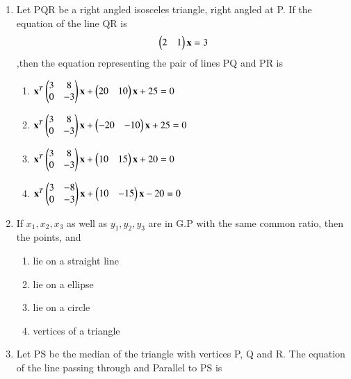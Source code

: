 \begin{enumerate}
\begin{enumerate}
     \item {}
     \item {}
     \item {}
     \end{enumerate}
    \item Let PQR be a right angled isosceles triangle, right angled at  P. If the equation of the line QR is \begin{align}\begin{pmatrix}2 & 1\end{pmatrix}\mathbf{x} = 3\end{align},then the equation representing the pair of lines PQ and PR is
    \begin{enumerate}
     \item  $\mathbf{x}^T\begin{pmatrix}3 & 8 \\ 0 & -3\end{pmatrix}\mathbf{x} + \begin{pmatrix}20 & 10\end{pmatrix}\mathbf{x} + 25 = 0$
     \item  $\mathbf{x}^T\begin{pmatrix}3 & 8 \\ 0 & -3\end{pmatrix}\mathbf{x} + \begin{pmatrix}-20 & -10\end{pmatrix}\mathbf{x} + 25 = 0$
     \item  $\mathbf{x}^T\begin{pmatrix}3 & 8 \\ 0 & -3\end{pmatrix}\mathbf{x} + \begin{pmatrix}10 & 15\end{pmatrix}\mathbf{x} + 20 = 0$
     \item  $\mathbf{x}^T\begin{pmatrix}3 & -8 \\ 0 & -3\end{pmatrix}\mathbf{x} + \begin{pmatrix}10 & -15\end{pmatrix}\mathbf{x} - 20 = 0$
     \end{enumerate}
    \item If $x_1,x_2,x_3$ as well as $y_1,y_2,y_3$ are in G.P with the same common ratio, then the points, and 
    \begin{enumerate}
     \item  lie on a straight line
     \item  lie on a ellipse
    \item  lie on a circle
    \item  vertices of a triangle
    \end{enumerate}
    \item Let PS be the median of the triangle with vertices P, Q and R. The equation of the line passing through and Parallel to PS is

\end{enumerate}
